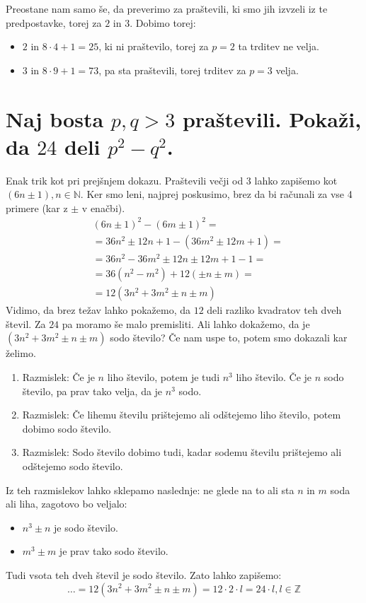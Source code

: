 \documentclass[12pt,a4paper,slovene]{article}
\begin{document}
\begin{enumerate}[a)]
    Preostane nam samo še, da preverimo za praštevili, ki smo jih izvzeli iz te predpostavke, torej za $2$ in $3$. Dobimo torej:
    \begin{itemize}
        \item $2$ in $8 \cdot 4 + 1 = 25$, ki ni praštevilo, torej za $p = 2$ ta trditev ne velja.
        \item $3$ in $8 \cdot 9 + 1 = 73$, pa sta praštevili, torej trditev za $p = 3$ velja. 
    \end{itemize}
\end{enumerate}

\section{Naj bosta $p, q > 3$ praštevili. Pokaži, da $24$ deli $p^2 - q^2$.}

Enak trik kot pri prejšnjem dokazu. Praštevili večji od 3 lahko zapišemo kot $(6n \pm 1), n\in\mathbb{N}$. Ker smo leni, najprej poskusimo, brez da bi računali za vse 4 primere (kar z $\pm$ v enačbi).
\begin{align*}
&(6n \pm 1)^2 - (6m \pm 1)^2 = \\
&= 36n^2 \pm 12n + 1 - (36m^2 \pm 12m + 1) = \\
&= 36n^2 - 36m^2 \pm 12n \pm 12m + 1 - 1 = \\
&= 36(n^2 - m^2) + 12 (\pm n \pm m) = \\
&= 12(3n^2 + 3m^2 \pm n \pm m)
\end{align*}
Vidimo, da brez težav lahko pokažemo, da $12$ deli razliko kvadratov teh dveh števil. Za $24$ pa moramo še malo premisliti. Ali lahko dokažemo, da je $(3n^2 + 3m^2 \pm n \pm m)$ sodo število? Če nam uspe to, potem smo dokazali kar želimo.
\begin{enumerate}
    \item Razmislek: Če je $n$ liho število, potem je tudi $n^3$ liho število. Če je $n$ sodo število, pa prav tako velja, da je $n^3$ sodo.
    \item Razmislek: Če lihemu številu prištejemo ali odštejemo liho število, potem dobimo sodo število.
    \item Razmislek: Sodo število dobimo tudi, kadar sodemu številu prištejemo ali odštejemo sodo število. 
\end{enumerate}
Iz teh razmislekov lahko sklepamo naslednje: ne glede na to ali sta $n$ in $m$ soda ali liha, zagotovo bo veljalo:
\begin{itemize}
    \item $n^3 \pm n$ je sodo število.
    \item $m^3 \pm m$ je prav tako sodo število.
\end{itemize}
Tudi vsota teh dveh števil je sodo število. Zato lahko zapišemo:
\[
\ldots = 12(3n^2 + 3m^2 \pm n \pm m) = 12 \cdot 2 \cdot l = 24 \cdot l, l\in\mathbb{Z}
\]
\end{document}
